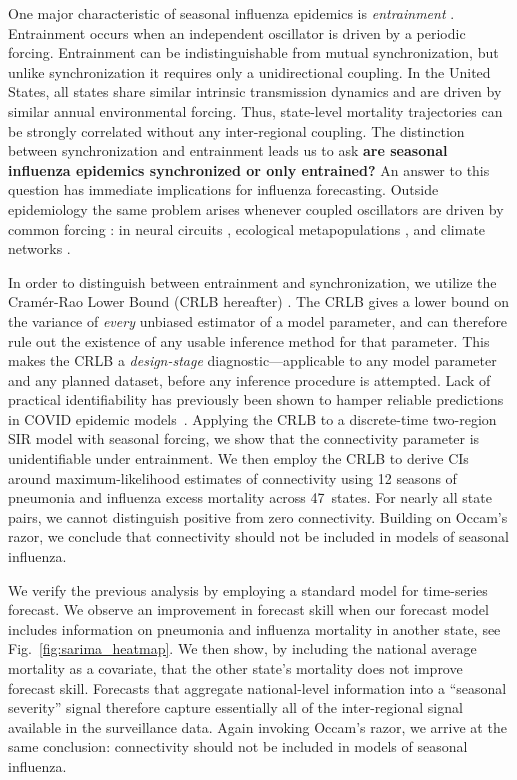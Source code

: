 One major characteristic of seasonal influenza epidemics is
\emph{entrainment} \citep{pikovsky2001}.  Entrainment occurs when an
independent oscillator is driven by a periodic forcing. Entrainment
can be indistinguishable from mutual synchronization, but unlike
synchronization it requires only a unidirectional coupling. In the
United States, all states share similar intrinsic transmission
dynamics and are driven by similar annual environmental forcing. Thus,
state-level mortality trajectories can be strongly correlated without
any inter-regional coupling.  The distinction between synchronization
and entrainment leads us to ask \textbf{are seasonal influenza
  epidemics synchronized or only entrained?} An answer to this
question has immediate implications for influenza forecasting.
Outside epidemiology the same problem arises whenever coupled
oscillators are driven by common forcing \citep{pikovsky2001}: in
neural circuits \citep{reid2019, friston2011}, ecological
metapopulations \citep{bjornstad1999, grenfell1998}, and climate
networks \citep{tsonis2004architecture}.

In order to distinguish between entrainment and synchronization, we
utilize the Cram\'er-Rao Lower Bound (CRLB hereafter)
\citep{casella2024statistical, wilke2020}. The CRLB gives a lower
bound on the variance of \emph{every} unbiased estimator of a model
parameter, and can therefore rule out the existence of any usable
inference method for that parameter. This makes the CRLB a
\emph{design-stage} diagnostic---applicable to any model parameter and
any planned dataset, before any inference procedure is attempted.
Lack of practical identifiability has previously been shown to hamper
reliable predictions in COVID epidemic models~\citep{gallo2022}.
Applying the CRLB to a discrete-time two-region SIR model with
seasonal forcing, we show that the connectivity parameter is
unidentifiable under entrainment. We then employ the CRLB to derive
CIs around maximum-likelihood estimates of connectivity using 12
seasons of pneumonia and influenza excess mortality across
47~states. For nearly all state pairs, we cannot distinguish positive
from zero connectivity. Building on Occam's razor, we conclude that
connectivity should not be included in models of seasonal influenza.

We verify the previous analysis by employing a standard model for
time-series forecast. We observe an improvement in forecast skill when
our forecast model includes information on pneumonia and influenza
mortality in another state, see Fig.~\ref{fig:sarima_heatmap}. We then
show, by including the national average mortality as a covariate, that
the other state's mortality does not improve forecast skill. Forecasts
that aggregate national-level information into a ``seasonal severity''
signal therefore capture essentially all of the inter-regional signal
available in the surveillance data. Again invoking Occam's razor, we
arrive at the same conclusion: connectivity should not be included in
models of seasonal influenza.
